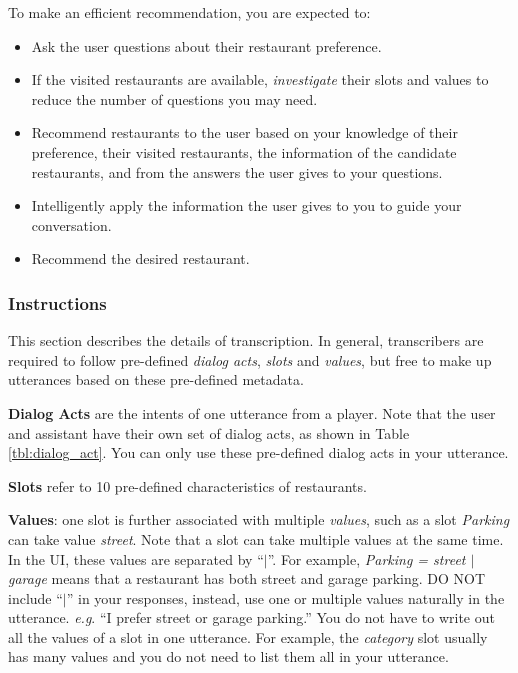\documentclass[11pt,a4paper]{article}
\makeatletter
\DeclareRobustCommand\onedot{\futurelet\@let@token\@onedot}
\def\onedot{. }
\def\eg{\emph{e.g}\onedot} \def\Eg{\emph{E.g}\onedot}
\makeatother
\begin{document}
To make an efficient recommendation, you are expected to: 
\begin{itemize}
\itemsep0em
    \item Ask the user questions about their restaurant preference.
    \item If the visited restaurants are available, \textit{investigate} their slots and values to reduce the number of questions you may need. 
    \item Recommend restaurants to the user based on your knowledge of their preference, their visited restaurants, the information of the candidate restaurants, and from the answers the user gives to your questions.
    \item Intelligently apply the information the user gives to you to guide your conversation.
    \item Recommend the desired restaurant.
\end{itemize}

\subsubsection{Instructions}
This section describes the details of transcription. In general, transcribers are required to follow pre-defined \textit{dialog acts}, \textit{slots} and \textit{values}, but free to make up utterances based on these pre-defined metadata.

\noindent \textbf{Dialog Acts} are the intents of one utterance from a player. 
Note that the user and assistant have their own set of dialog acts, as shown in Table \ref{tbl:dialog_act}. You can only use these pre-defined dialog acts in your utterance.

\noindent \textbf{Slots} refer to 10 pre-defined characteristics of restaurants. %

\noindent \textbf{Values}: one slot is further associated with multiple \textit{values}, such as a slot \textit{Parking} can take value \textit{street}.
Note that a slot can take multiple values at the same time. In the UI, these values are separated by ``$\vert$''. For example, \textit{Parking = street $\vert$ garage} means that a restaurant has both street and garage parking.
DO NOT include ``$\vert$'' in your responses, instead, use one or multiple values naturally in the utterance. \eg ``I prefer street or garage parking.''
You do not have to write out all the values of a slot in one utterance. For example, the \textit{category} slot usually has many values and you do not need to list them all in your utterance.
\end{document}
